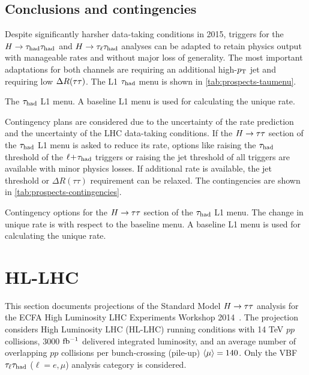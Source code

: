 \subsection{Conclusions and contingencies}

Despite significantly harsher data-taking conditions in 2015, triggers for the $H\rightarrow\tau_\text{had}\tau_\text{had}$ and $H\rightarrow\tau_\ell\tau_\text{had}$ analyses can be adapted to retain physics output with manageable rates and without major loss of generality. The most important adaptations for both channels are requiring an additional high-$p_{\mathrm{T}}$ jet and requiring low $\Delta R(\tau\tau)$. The L1 $\tau_\text{had}$ menu is shown in \cref{tab:prospects-taumenu}.

\begin{table}[bp]
  \centering
  \renewcommand{\arraystretch}{1.4}
  \caption{The $\tau_\text{had}$ L1 menu. A baseline L1 menu is used for calculating the unique rate.}
  
  \label{tab:prospects-taumenu}
\end{table}

Contingency plans are considered due to the uncertainty of the rate prediction and the uncertainty of the LHC data-taking conditions. If the $H\rightarrow\tau\tau$ section of the $\tau_\text{had}$ L1 menu is asked to reduce its rate, options like raising the $\tau_\text{had}$ threshold of the $\ell\!+\!\tau_\text{had}$ triggers or raising the jet threshold of all triggers are available with minor physics losses. If additional rate is available, the jet threshold or $\Delta R(\tau\tau)$ requirement can be relaxed. The contingencies are shown in \cref{tab:prospects-contingencies}.

\begin{table}[bp]
  \centering
  \renewcommand{\arraystretch}{1.4}
  \caption{Contingency options for the $H\rightarrow\tau\tau$ section of the $\tau_\text{had}$ L1 menu. The change in unique rate is with respect to the baseline menu. A baseline L1 menu is used for calculating the unique rate.}
  
  \label{tab:prospects-contingencies}
\end{table}


\section{HL-LHC}
\label{sec:prospects-hllhc}

This section documents projections of the Standard Model $H\rightarrow\tau\tau$ analysis for the ECFA High Luminosity LHC Experiments Workshop 2014~\cite{ATL-PHYS-PUB-2014-018}. The projection considers High Luminosity LHC (HL-LHC) running conditions with 14 TeV $pp$ collisions, 3000 $\mbox{fb$^{-1}$}$ delivered integrated luminosity, and an average number of overlapping $pp$ collisions per bunch-crossing (pile-up) $\langle\mu\rangle = 140$. Only the VBF $\tau_\ell\tau_\text{had}$ ($\ell = e,\mu$) analysis category is considered.

